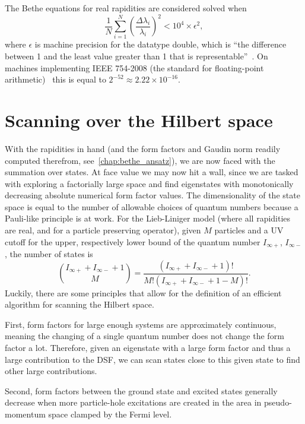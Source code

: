 \documentclass[11pt, a4paper]{report} %
\begin{document}
The Bethe equations for real rapidities are considered solved when~\cite{Caux2009}
\begin{equation}
	\frac{1}{N}\sum_{i=1}^{N} \left(\frac{\Delta \lambda_i}{\lambda_i}\right)^2 < 10^4 \times \epsilon^2,
\end{equation}
where \(\epsilon\) is machine precision for the datatype double, which is ``the difference between 1 and the least value greater than 1 that is representable''~\cite{cppstandard2016}.
On machines implementing IEEE 754-2008 (the standard for floating-point arithmetic)~\cite{ieeefp2008} this is equal to \({2^{-52} \approx 2.22 \times 10^{-16}}\).


\section{Scanning over the Hilbert space}

With the rapidities in hand (and the form factors and Gaudin norm readily computed therefrom, see~\cref{chap:bethe_ansatz}), we are now faced with the summation over states.
At face value we may now hit a wall, since we are tasked with exploring a factorially large space and find eigenstates with monotonically decreasing absolute numerical form factor values.
The dimensionality of the state space is equal to the number of allowable choices of quantum numbers because a Pauli-like principle is at work.
For the Lieb-Liniger model (where all rapidities are real, and for a particle preserving operator), given $M$ particles and a UV cutoff for the upper, respectively lower bound of the quantum number $I_{\infty+}$, $I_{\infty-}$, the number of states is~\cite{Caux2009}
\begin{equation}
  \binom{I_{\infty+} + I_{\infty-} + 1}{M} = \frac{(I_{\infty+} + I_{\infty-} + 1)!}{M!(I_{\infty+} + I_{\infty-} + 1 - M)!}.
\end{equation}
Luckily, there are some principles that allow for the definition of an efficient algorithm for scanning the Hilbert space.

First, form factors for large enough systems are approximately continuous, meaning the changing of a single quantum number does not change the form factor a lot.
Therefore, given an eigenstate with a large form factor and thus a large contribution to the DSF, we can scan states close to this given state to find other large contributions.

Second, form factors between the ground state and excited states generally decrease when more particle-hole excitations are created in the area in pseudo-momentum space clamped by the Fermi level.
\end{document}
